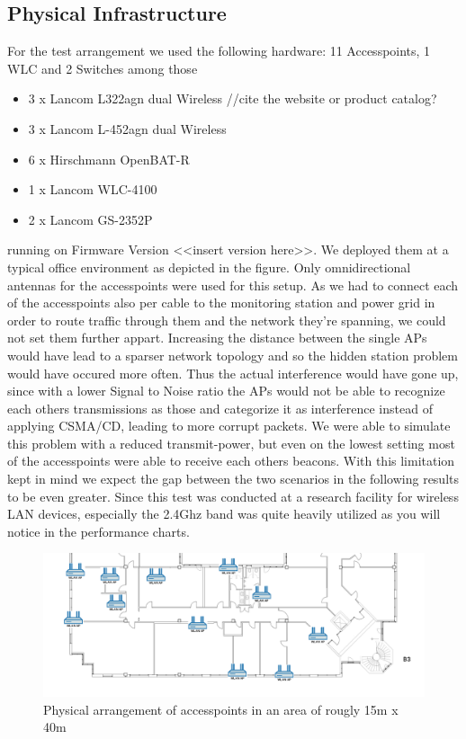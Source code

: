   \subsection{Physical Infrastructure}
    For the test arrangement we used the following hardware:
      11 Accesspoints, 1 WLC and 2 Switches among those
      \begin{itemize}
       \item 3 x Lancom L322agn dual Wireless //cite the website or product catalog?
       \item 3 x Lancom L-452agn dual Wireless
       \item 6 x Hirschmann OpenBAT-R
       \item 1 x Lancom WLC-4100
       \item 2 x Lancom GS-2352P
      \end{itemize}
      running on Firmware Version <<insert version here>>. We deployed them at a typical office environment as depicted in the figure.
      Only omnidirectional antennas for the accesspoints were used for this setup. As we had to connect each of the accesspoints also
      per cable to the monitoring station and power grid in order to route traffic through them and the network they're spanning,
      we could not set them further appart.
      Increasing the distance between the single APs would have lead to a sparser network topology and so the hidden station problem would have occured
      more often. Thus the actual interference would have gone up, since with a lower Signal to Noise ratio the APs would not be able to recognize each others 
      transmissions as those and categorize it as interference instead of applying CSMA/CD, leading to more corrupt packets.
      We were able to simulate this problem with a reduced transmit-power,
      but even on the lowest setting most of the accesspoints were able to receive each others beacons. With this limitation kept in mind we expect
      the gap between the two scenarios in the following results to be even greater.
      Since this test was conducted at a research facility for wireless LAN devices, especially the 2.4Ghz band was quite heavily utilized as you will notice
      in the performance charts.
    \begin{figure}[t]
      \centering
      \includegraphics[width=1\columnwidth]{figures/Lancom-flur-withaps}
      \caption{Physical arrangement of accesspoints in an area of rougly 15m x 40m}
      \label{fig:2ndfloor}
    \end{figure}
